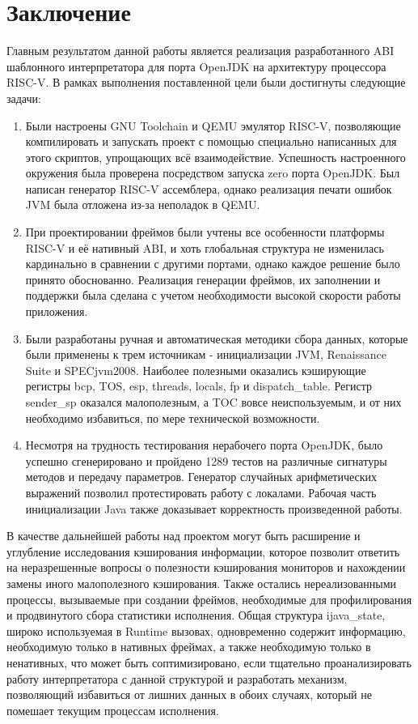 \section*{Заключение}

Главным результатом данной работы является реализация разработанного ABI шаблонного интерпретатора для порта OpenJDK на архитектуру процессора RISC-V. В рамках выполнения поставленной цели были достигнуты следующие задачи:

\begin{enumerate}
    \item Были настроены GNU Toolchain и QEMU эмулятор RISC-V, позволяющие компилировать и запускать проект с помощью специально написанных для этого скриптов, упрощающих всё взаимодействие. Успешность настроенного окружения была проверена посредством запуска zero порта OpenJDK. Был написан генератор RISC-V ассемблера, однако реализация печати ошибок JVM была отложена из-за неполадок в QEMU.
    
    \item При проектировании фреймов были учтены все особенности платформы RISC-V и её нативный ABI, и хоть глобальная структура не изменилась кардинально в сравнении с другими портами, однако каждое решение было принято обоснованно. Реализация генерации фреймов, их заполнении и поддержки была сделана с учетом необходимости высокой скорости работы приложения.
    
    \item Были разработаны ручная и автоматическая методики сбора данных, которые были применены к трем источникам - инициализации JVM, Renaissance Suite и SPECjvm2008. Наиболее полезными оказались кэширующие регистры bcp, TOS, esp, threads, locals, fp и dispatch\_table. Регистр sender\_sp оказался малополезным, а TOC вовсе неиспользуемым, и от них необходимо избавиться, по мере технической возможности.
    
    \item Несмотря на трудность тестирования нерабочего порта OpenJDK, было успешно сгенерировано и пройдено 1289 тестов на различные сигнатуры методов и передачу параметров. Генератор случайных арифметических выражений позволил протестировать работу с локалами. Рабочая часть инициализации Java также доказывает корректность произведенной работы.
\end{enumerate}

В качестве дальнейшей работы над проектом могут быть расширение и углубление исследования кэширования информации, которое позволит ответить на неразрешенные вопросы о полезности кэширования мониторов и нахождении замены иного малополезного кэширования. Также остались нереализованными процессы, вызываемые при создании фреймов, необходимые для профилирования и продвинутого сбора статистики исполнения. Общая структура ijava\_state, широко используемая в Runtime вызовах, одновременно содержит информацию, необходимую только в нативных фреймах, а также необходимую только в ненативных, что может быть соптимизировано, если тщательно проанализировать работу интерпретатора с данной структурой и разработать механизм, позволяющий избавиться от лишних данных в обоих случаях, который не помешает текущим процессам исполнения.